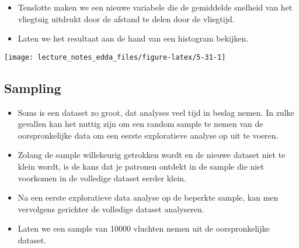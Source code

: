 \documentclass[]{memoir}
\newenvironment{Shaded}{\begin{snugshade}}{\end{snugshade}}
\newcommand{\DataTypeTok}[1]{\textcolor[rgb]{0.13,0.29,0.53}{#1}}
\newcommand{\DecValTok}[1]{\textcolor[rgb]{0.00,0.00,0.81}{#1}}
\newcommand{\FloatTok}[1]{\textcolor[rgb]{0.00,0.00,0.81}{#1}}
\newcommand{\KeywordTok}[1]{\textcolor[rgb]{0.13,0.29,0.53}{\textbf{#1}}}
\newcommand{\NormalTok}[1]{#1}
\newcommand{\OperatorTok}[1]{\textcolor[rgb]{0.81,0.36,0.00}{\textbf{#1}}}
\newcommand{\StringTok}[1]{\textcolor[rgb]{0.31,0.60,0.02}{#1}}
\providecommand{\tightlist}{%
  \setlength{\itemsep}{0pt}\setlength{\parskip}{0pt}}
\begin{document}
\begin{itemize}
\tightlist
\item
  Tenslotte maken we een nieuwe variabele die de gemiddelde snelheid van het vliegtuig uitdrukt door de afstand te delen door de vliegtijd.
\end{itemize}

\begin{Shaded}
\end{Shaded}

\begin{itemize}
\tightlist
\item
  Laten we het resultaat aan de hand van een histogram bekijken.
\end{itemize}

\texttt{[image: lecture\_notes\_edda\_files/figure-latex/5-31-1]}

\hypertarget{sampling}{%
\subsection{Sampling}\label{sampling}}

\begin{itemize}
\tightlist
\item
  Soms is een dataset zo groot, dat analyses veel tijd in beslag nemen. In zulke gevallen kan het nuttig zijn om een random sample te nemen van de oorspronkelijke data om een eerste exploratieve analyse op uit te voeren.
\item
  Zolang de sample willekeurig getrokken wordt en de nieuwe dataset niet te klein wordt, is de kans dat je patronen ontdekt in de sample die niet voorkomen in de volledige dataset eerder klein.
\item
  Na een eerste exploratieve data analyse op de beperkte sample, kan men vervolgens gerichter de volledige dataset analyseren.
\item
  Laten we een sample van 10000 vluchten nemen uit de oorspronkelijke dataset.
\end{itemize}

\begin{Shaded}
\end{Shaded}
\end{document}

